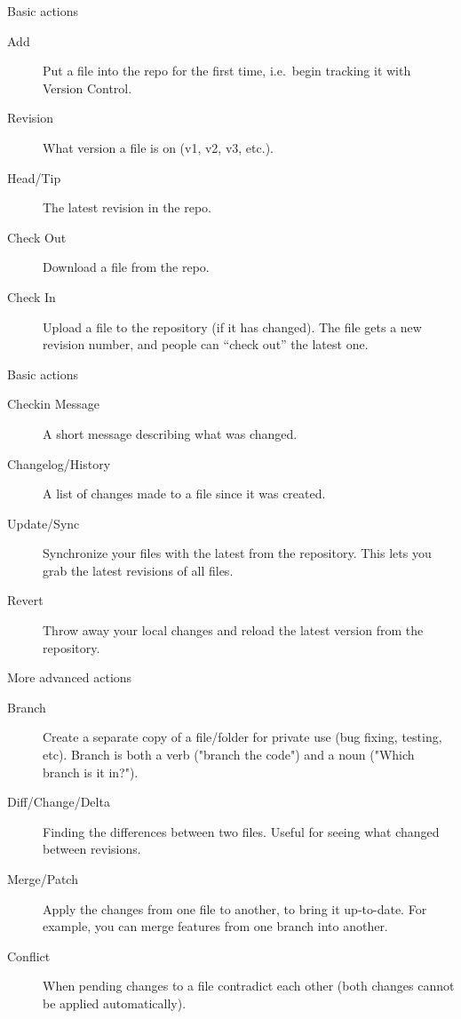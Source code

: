 \documentclass[aspectratio=169]{beamer}
\begin{document}
\begin{frame}{Basic actions}

\begin{description}
\item[Add] Put a file into the repo for the first time,
  i.e.~begin tracking it with Version Control.
\item[Revision] What version a file is on (v1, v2, v3, etc.).
\item[Head/Tip] The latest revision in the repo.
\item[Check Out] Download a file from the repo.
\item[Check In] Upload a file to the repository (if it has
  changed). The file gets a new revision number, and people can ``check
  out'' the latest one.
  \end{description}
  
  \end{frame}

\begin{frame}{Basic actions}

\begin{description}
\item[Checkin Message] A short message describing what was
  changed.
\item[Changelog/History] A list of changes made to a file since
  it was created.
\item[Update/Sync] Synchronize your files with the latest from
  the repository. This lets you grab the latest revisions of all files.
\item[Revert] Throw away your local changes and reload the latest
  version from the repository.
\end{description}

\end{frame}

\begin{frame}{More advanced actions}

\begin{description}
\item[Branch] Create a separate copy of a file/folder for private
  use (bug fixing, testing, etc). Branch is both a verb ("branch the
  code") and a noun ("Which branch is it in?").
\item[Diff/Change/Delta] Finding the differences between two
  files. Useful for seeing what changed between revisions.
\item[Merge/Patch] Apply the changes from one file to another, to
  bring it up-to-date. For example, you can merge features from one
  branch into another.
\item[Conflict] When pending changes to a file contradict each
  other (both changes cannot be applied automatically).
\end{description}
\end{frame}
\end{document}
